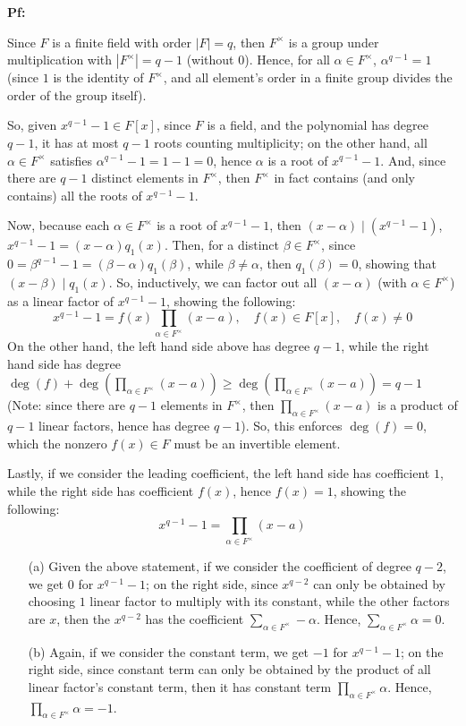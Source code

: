 \documentclass{article}
\begin{document}
\textbf{Pf:}

Since $F$ is a finite field with order $|F|=q$, then $F^\times$ is a group under multiplication with $|F^\times|=q-1$ (without $0$).
Hence, for all $\alpha\in F^\times$, $\alpha^{q-1}=1$ (since $1$ is the identity of $F^\times$, and all element's order in a finite group divides the order of the group itself).

So, given $x^{q-1}-1\in F[x]$, since $F$ is a field, and the polynomial has degree $q-1$, it has at most $q-1$ roots counting multiplicity; on the other hand,
all $\alpha\in F^\times$ satisfies $\alpha^{q-1}-1=1-1=0$, hence $\alpha$ is a root of $x^{q-1}-1$. And, since there are $q-1$ distinct elements in $F^\times$,
then $F^\times$ in fact contains (and only contains) all the roots of $x^{q-1}-1$.

Now, because each $\alpha\in F^\times$ is a root of $x^{q-1}-1$, then $(x-\alpha)\mid (x^{q-1}-1)$, $x^{q-1}-1=(x-\alpha)q_1(x)$. Then, for a distinct $\beta\in F^\times$,
since $0=\beta^{q-1}-1=(\beta-\alpha)q_1(\beta)$, while $\beta\neq \alpha$, then $q_1(\beta)=0$, showing that $(x-\beta)\mid q_1(x)$.
So, inductively, we can factor out all $(x-\alpha)$ (with $\alpha\in F^\times$) as a linear factor of $x^{q-1}-1$, showing the following:
$$x^{q-1}-1=f(x)\prod_{\alpha\in F^\times}(x-a),\quad f(x)\in F[x],\quad f(x)\neq 0$$
On the other hand, the left hand side above has degree $q-1$, while the right hand side has degree $\deg(f)+\deg(\prod_{\alpha\in F^\times}(x-a))\geq \deg(\prod_{\alpha\in F^\times}(x-a))=q-1$ 
(Note: since there are $q-1$ elements in $F^\times$, then $\prod_{\alpha\in F^\times}(x-a)$ is a product of $q-1$ linear factors, hence has degree $q-1$).
So, this enforces $\deg(f)=0$, which the nonzero $f(x)\in F$ must be an invertible element.

Lastly, if we consider the leading coefficient, the left hand side has coefficient $1$, while the right side has coefficient $f(x)$, hence $f(x)=1$, showing the following:
$$x^{q-1}-1=\prod_{\alpha\in F^\times}(x-a)$$
\begin{itemize}
    \item[(a)] Given the above statement, if we consider the coefficient of degree $q-2$, we get $0$ for $x^{q-1}-1$; on the right side, since $x^{q-2}$ can only be obtained by choosing $1$ linear factor to multiply with its constant, 
    while the other factors are $x$, then the $x^{q-2}$ has the coefficient $\sum_{\alpha\in F^\times}-\alpha$. Hence, $\sum_{\alpha\in F^\times}\alpha=0$.

    \item[(b)] Again, if we consider the constant term, we get $-1$ for $x^{q-1}-1$; on the right side, since constant term can only be obtained by the product of all linear factor's constant term, then it has constant term $\prod_{\alpha\in F^\times}\alpha$.
    Hence, $\prod_{\alpha\in F^\times}\alpha=-1$.
\end{itemize}
\end{document}
